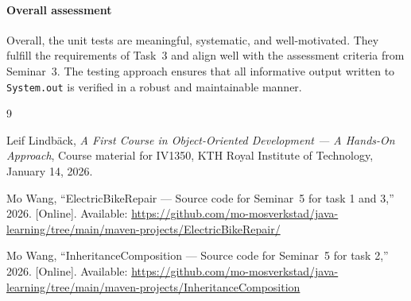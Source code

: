 \documentclass[a4paper]{scrartcl}
\begin{document}
\paragraph{Overall assessment}
Overall, the unit tests are meaningful, systematic, and well-motivated. They fulfill the requirements of Task~3 and align well with the assessment criteria from Seminar~3. The testing approach ensures that all informative output written to \texttt{System.out} is verified in a robust and maintainable manner.




\begin{thebibliography}{9}

Leif Lindbäck,
\textit{A First Course in Object-Oriented Development --- A Hands-On Approach},
Course material for IV1350,
KTH Royal Institute of Technology,
January 14, 2026.

Mo Wang,
``ElectricBikeRepair --- Source code for Seminar~5 for task 1 and 3,''
2026.
[Online]. Available: \url{https://github.com/mo-mosverkstad/java-learning/tree/main/maven-projects/ElectricBikeRepair/}

Mo Wang,
``InheritanceComposition --- Source code for Seminar~5 for task 2,''
2026.
[Online]. Available: \url{https://github.com/mo-mosverkstad/java-learning/tree/main/maven-projects/InheritanceComposition}

\end{thebibliography}
\end{document}
